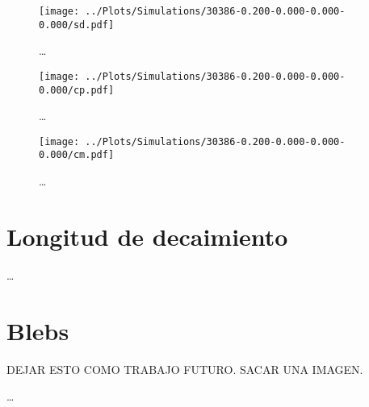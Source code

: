 \begin{figure}
  \centering
  \texttt{[image: ../Plots/Simulations/30386-0.200-0.000-0.000-0.000/sd.pdf]}
  \caption{\dots}
  \label{fig:sd_i}
\end{figure}

\begin{figure}
  \centering
  \texttt{[image: ../Plots/Simulations/30386-0.200-0.000-0.000-0.000/cp.pdf]}
  \caption{\dots}
  \label{fig:cp_i}
\end{figure}

\begin{figure}
  \centering
  \texttt{[image: ../Plots/Simulations/30386-0.200-0.000-0.000-0.000/cm.pdf]}
  \caption{\dots}
  \label{fig:cm_i}
\end{figure}

\section{Longitud de decaimiento}

\dots

\section{Blebs}

DEJAR ESTO COMO TRABAJO FUTURO. SACAR UNA IMAGEN.

\dots
